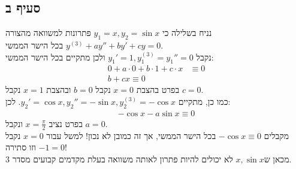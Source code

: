 \documentclass{article}
\begin{document}
\subsection*{סעיף ב}

נניח בשלילה כי $y_1=x, y_2=\sin x$ פתרונות למשוואה מהצורה $y^{(3)}+ay''+by'+cy=0$ בכל הישר הממשי. \\
נקבל $y_1'=1, y^{(3)}_1=y_1''=0$ ולכן מתקיים בכל הישר הממשי:
\begin{align*}
    0+a\cdot 0 + b \cdot 1 + c\cdot x & \equiv 0 \\
    b+cx \equiv 0
\end{align*}
בפרט בהצבת $x=0$ נקבל $b=0$ ובהצבת $x=1$ נקבל $c=0$.\\
כמו כן, מתקיים $y_2'=\cos x, y_2''=-\sin x, y^{(3)}_2=-\cos x$. לכן:
\begin{align*}
    -\cos x - a \sin x \equiv 0
\end{align*}
בפרט נציב $x=\frac{\pi}{2}$ ונקבל $a=0$. \\
מקבלים $-\cos x \equiv 0$ בכל הישר הממשי, אך זה כמובן לא נכון! למשל עבור $x=0$ נקבל $-1=0$ וזו סתירה! \\
מכאן ש$x, \sin x$ לא יכולים להיות פתרון לאותה משוואה בעלת מקדמים קבועים מסדר 3.

\pagebreak
\end{document}
